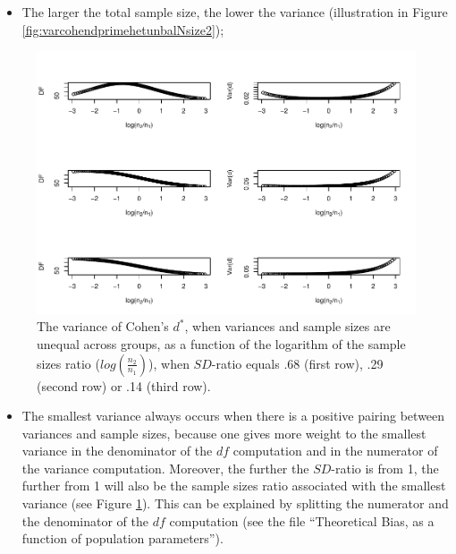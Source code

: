 \documentclass[
  english,
  man,mask]{apa6}
\providecommand{\tightlist}{%
  \setlength{\itemsep}{0pt}\setlength{\parskip}{0pt}}
\begin{document}
\begin{itemize}
\tightlist
\item
  The larger the total sample size, the lower the variance (illustration in Figure \ref{fig:varcohendprimehetunbalNsize2});
\end{itemize}

\begin{figure}
\centering
\includegraphics{Theoretical-Variance-of-all-estimators-as-a-function-of-population-parameters_files/figure-latex/varcohendprimehetunbalnratiosdratio2-1.pdf}
\caption{\label{fig:varcohendprimehetunbalnratiosdratio2}The variance of Cohen's \(d^*\), when variances and sample sizes are unequal across groups, as a function of the logarithm of the sample sizes ratio (\(log \left( \frac{n_2}{n_1} \right)\)), when \(SD\)-ratio equals .68 (first row), .29 (second row) or .14 (third row).}
\end{figure}

\begin{itemize}
\tightlist
\item
  The smallest variance always occurs when there is a positive pairing between variances and sample sizes, because one gives more weight to the smallest variance in the denominator of the \(df\) computation and in the numerator of the variance computation. Moreover, the further the \(SD\)-ratio is from 1, the further from 1 will also be the sample sizes ratio associated with the smallest variance (see Figure \ref{fig:varcohendprimehetunbalnratiosdratio2}). This can be explained by splitting the numerator and the denominator of the \(df\) computation (see the file ``Theoretical Bias, as a function of population parameters'').
\end{itemize}
\end{document}
